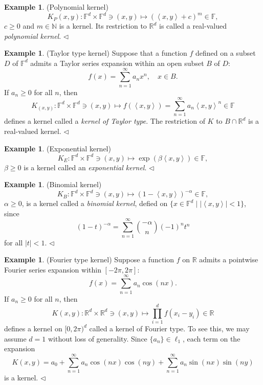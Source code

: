 \documentclass[a4paper,12pt]{article}
\theoremstyle{remark}
\theoremstyle{definition}
\theoremstyle{definition}
\newtheorem{ex}[thm]{Example}
\theoremstyle{definition}
\newcommand{\ip}[2]{\left<#1, #2 \right>}
\newcommand{\abs}[1]{\left| #1 \right|}
\newcommand{\fin}{\hfill \( \triangleleft \) }
\begin{document}
\begin{ex}(Polynomial kernel)\label{ex polynomial kernel}
	\[
		K_P(x,y) : \mathbb{F}^d \times \mathbb{F}^d \ni (x,y) \mapsto  \left( \ip{x}{y} + c \right)^{m} \in \mathbb{F},
	\]
	\( c \ge 0 \) and \( m \in \mathbb{N} \) is a kernel. Its restriction to \( \mathbb{R}^d \) is called a real-valued \textit{polynomial kernel}.
	\fin\end{ex}

\begin{ex} (Taylor type kernel) \label{ex taylor kernel}
	Suppose that a function \( f \) defined on a subset \( D \) of \( \mathbb{F}^d \) admits a Taylor series expansion within an open subset \( B \) of \( D \):
	\[
		f(x) = \sum_{n=1}^{\infty} a_n x^{n},\quad x \in B.
	\]
	If \( a_n \ge 0 \) for all \( n \), then
	\[
		K_(x,y) : \mathbb{F}^d \times \mathbb{F}^d \ni (x,y)
		\mapsto f(\ip{x}{y}) = \sum_{n=1}^{\infty} a_n \ip{x}{y}^n
		\in \mathbb{F}
	\]
	defines a kernel called a \textit{kernel of Taylor type}. The restriction of \( K \) to \( B \cap \mathbb{R}^d \) is a real-valued kernel.
	\fin\end{ex}

\begin{ex}(Exponential kernel) \label{ex exponential kernel}
	\[
		K_E : \mathbb{F}^d \times \mathbb{F}^d \ni (x,y)
		\mapsto \exp \left( \beta \ip{x}{y} \right) \in \mathbb{F},
	\]
	\( \beta \ge 0 \) is a kernel called an \textit{exponential kernel}.
	\fin\end{ex}

\begin{ex}(Binomial kernel) \label{ex binomial kernel}
	\[
		K_B : \mathbb{F}^d \times \mathbb{F}^d \ni (x,y)
		\mapsto \left( 1 - \ip{x}{y} \right)^{-\alpha} \in \mathbb{F},
	\]
	\( \alpha \ge 0 \), is a kernel called a \textit{binomial kernel}, defied on \( \{ x \in \mathbb{F}^d \mid \abs{\ip{x}{y}}< 1\} \),
	since
	\[
		(1-t)^{-\alpha} = \sum_{n=1}^{\infty} \binom{-\alpha}{n}(-1)^{n}t^{n}
	\]
	for all \( \abs{t} < 1 \).
	\fin\end{ex}

\begin{ex} (Fourier type kernel) \label{ex Fourier kernel}
	Suppose a function \( f \) on \( \mathbb{R} \) admits a pointwise Fourier series expansion within \( [-2 \pi, 2 \pi] \):
	\[
		f(x) = \sum_{n=1}^{\infty} a_n \cos (nx).
	\]
	If \( a_n \ge 0 \) for all \( n \), then
	\[
		K(x,y) : \mathbb{R}^d \times \mathbb{R}^d \ni (x,y)
		\mapsto \prod_{i=1}^{d} f(x_i- y_i) \in \mathbb{R}
	\]
	defines a kernel on \( [0,2 \pi)^{d} \) called a kernel of Fourier type.
	To see this, we may assume \( d= 1 \) without loss of generality. Since \( \{a_n\} \in \ell_1 \), each term on the expansion
	\[
		K(x,y) = a_0 + \sum_{n=1}^{\infty} a_n \cos (nx) \cos(ny) + \sum_{n=1}^{\infty} a_n \sin (nx) \sin (ny)
	\]
	is a kernel.
	\fin\end{ex}
\end{document}
